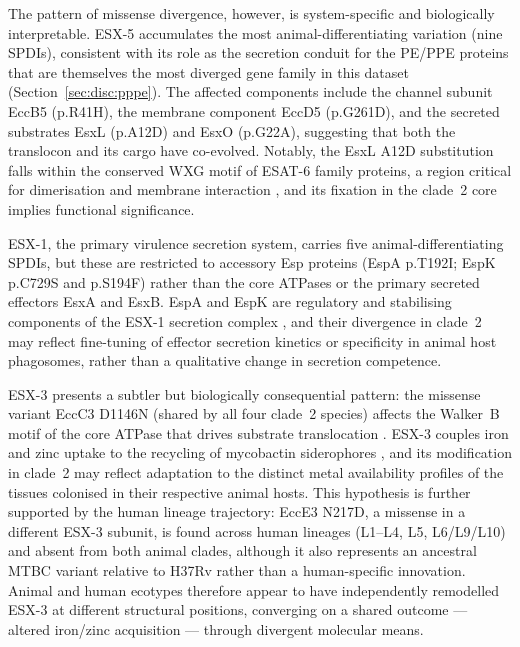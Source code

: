 \documentclass[11pt,a4paper]{article}
\begin{document}
The pattern of missense divergence, however, is system-specific and biologically
interpretable.
%
ESX-5 accumulates the most animal-differentiating variation (nine SPDIs), consistent
with its role as the secretion conduit for the PE/PPE proteins that are themselves
the most diverged gene family in this dataset (Section~\ref{sec:disc:pppe}).
%
The affected components include the channel subunit EccB5 (p.R41H), the membrane
component EccD5 (p.G261D), and the secreted substrates EsxL (p.A12D) and EsxO
(p.G22A), suggesting that both the translocon and its cargo have co-evolved.
%
Notably, the EsxL A12D substitution falls within the conserved WXG motif of
ESAT-6 family proteins, a region critical for dimerisation and membrane
interaction \cite{Poulsen2014}, and its fixation in the clade~2 core implies
functional significance.

ESX-1, the primary virulence secretion system, carries five animal-differentiating SPDIs,
but these are restricted to accessory Esp proteins (EspA p.T192I; EspK p.C729S and
p.S194F) rather than the core ATPases or the primary secreted effectors EsxA and
EsxB.
%
EspA and EspK are regulatory and stabilising components of the ESX-1 secretion
complex \cite{Chen2013}, and their divergence in clade~2 may reflect
fine-tuning of effector secretion kinetics or specificity in animal host
phagosomes, rather than a qualitative change in secretion competence.

ESX-3 presents a subtler but biologically consequential pattern: the missense
variant EccC3 D1146N (shared by all four clade~2 species) affects the Walker~B
motif of the core ATPase that drives substrate translocation \cite{Poulsen2014}.
%
ESX-3 couples iron and zinc uptake to the recycling of mycobactin siderophores
\cite{Serafini2009}, and its modification in clade~2 may reflect
adaptation to the distinct metal availability profiles of the tissues colonised
in their respective animal hosts.
%
This hypothesis is further supported by the human lineage trajectory: EccE3
N217D, a missense in a different ESX-3 subunit, is found across human lineages
(L1--L4, L5, L6/L9/L10) and absent from both animal clades, although it also
represents an ancestral MTBC variant relative to H37Rv rather than a
human-specific innovation.
%
Animal and human ecotypes therefore appear to have independently remodelled
ESX-3 at different structural positions, converging on a shared outcome ---
altered iron/zinc acquisition --- through divergent molecular means.
\end{document}
